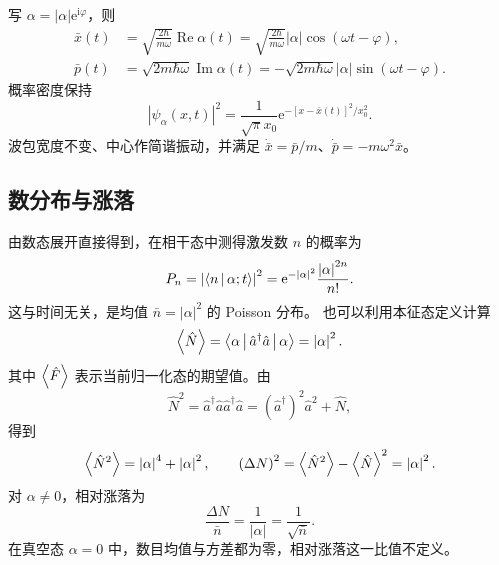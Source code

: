 写 $\alpha=\left|\alpha\right|\mathrm{e}^{\mathrm{i}\varphi}$，则
\begin{align}
\bar x\left(t\right)&=\sqrt{\frac{2\hbar}{m\omega}}\operatorname{Re}\alpha\left(t\right)
=\sqrt{\frac{2\hbar}{m\omega}}\left|\alpha\right|\cos\left(\omega t-\varphi\right),\\
\bar p\left(t\right)&=\sqrt{2m\hbar\omega}\operatorname{Im}\alpha\left(t\right)
=-\sqrt{2m\hbar\omega}\left|\alpha\right|\sin\left(\omega t-\varphi\right).
\end{align}
概率密度保持
\begin{equation}
\left|\psi_\alpha\left(x,t\right)\right|^2=\frac{1}{\sqrt\pi x_0}
\mathrm{e}^{-\left[x-\bar x\left(t\right)\right]^2/x_0^2}.
\end{equation}
波包宽度不变、中心作简谐振动，并满足
$\dot{\bar x}=\bar p/m$、$\dot{\bar p}=-m\omega^2\bar x$。

\subsection{数分布与涨落}
由数态展开直接得到，在相干态中测得激发数 $n$ 的概率为
\begin{equation}
P_n=\left|\Braket{n|\alpha;t}\right|^2
=\mathrm{e}^{-\left|\alpha\right|^2}\frac{\left|\alpha\right|^{2n}}{n!}.
\end{equation}
这与时间无关，是均值 $\bar n=\left|\alpha\right|^2$ 的 Poisson 分布。
也可以利用本征态定义计算
\begin{equation}
\Braket{\hat N}=\Braket{\alpha|\hat a^\dagger\hat a|\alpha}=\left|\alpha\right|^2.
\end{equation}
其中 $\Braket{\hat F}$ 表示当前归一化态的期望值。由
\begin{equation}
\hat N^2=\hat a^\dagger\hat a\hat a^\dagger\hat a
=\left(\hat a^\dagger\right)^2\hat a^2+\hat N,
\end{equation}
得到
\begin{equation}
\Braket{\hat N^2}=\left|\alpha\right|^4+\left|\alpha\right|^2,\qquad
\left(\Delta N\right)^2=\Braket{\hat N^2}-\Braket{\hat N}^2=\left|\alpha\right|^2.
\end{equation}
对 $\alpha\neq0$，相对涨落为
\begin{equation}
\frac{\Delta N}{\bar n}=\frac{1}{\left|\alpha\right|}=\frac{1}{\sqrt{\bar n}}.
\end{equation}
在真空态 $\alpha=0$ 中，数目均值与方差都为零，相对涨落这一比值不定义。

